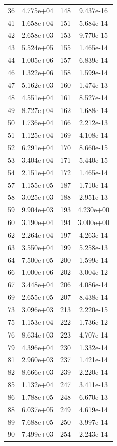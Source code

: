 \documentclass[12pt]{article}
\begin{document}
\begin{longtable}{@{}cccc@{}}
36 & 4.775e+04 & 148 & 9.437e-16 \\
41 & 1.658e+04 & 151 & 5.684e-14 \\
42 & 2.658e+03 & 153 & 9.770e-15 \\
43 & 5.524e+05 & 155 & 1.465e-14 \\
44 & 1.005e+06 & 157 & 6.839e-14 \\
46 & 1.322e+06 & 158 & 1.599e-14 \\
47 & 5.162e+03 & 160 & 1.474e-13 \\
48 & 4.551e+04 & 161 & 8.527e-14 \\
49 & 8.727e+04 & 162 & 1.688e-14 \\
50 & 1.736e+04 & 166 & 2.212e-13 \\
51 & 1.125e+04 & 169 & 4.108e-14 \\
52 & 6.291e+04 & 170 & 8.660e-15 \\
53 & 3.404e+04 & 171 & 5.440e-15 \\
54 & 2.151e+04 & 172 & 1.465e-14 \\
57 & 1.155e+05 & 187 & 1.710e-14 \\
58 & 3.025e+03 & 188 & 2.951e-13 \\
59 & 9.904e+03 & 193 & 4.230e+00 \\
60 & 3.190e+04 & 194 & 3.000e+00 \\
62 & 2.264e+04 & 197 & 4.263e-14 \\
63 & 3.550e+04 & 199 & 5.258e-13 \\
64 & 7.500e+05 & 200 & 1.599e-14 \\
66 & 1.000e+06 & 202 & 3.004e-12 \\
67 & 3.448e+04 & 206 & 4.086e-14 \\
69 & 2.655e+05 & 207 & 8.438e-14 \\
73 & 3.096e+03 & 213 & 2.220e-15 \\
75 & 1.153e+04 & 222 & 1.736e-12 \\
76 & 8.634e+03 & 223 & 4.707e-14 \\
79 & 4.396e+04 & 230 & 1.332e-14 \\
81 & 2.960e+03 & 237 & 1.421e-14 \\
82 & 8.666e+03 & 239 & 2.220e-14 \\
85 & 1.132e+04 & 247 & 3.411e-13 \\
86 & 1.788e+05 & 248 & 6.670e-13 \\
88 & 6.037e+05 & 249 & 4.619e-14 \\
89 & 7.688e+05 & 250 & 3.997e-14 \\
90 & 7.499e+03 & 254 & 2.243e-14 \\

\end{longtable}
\end{document}
